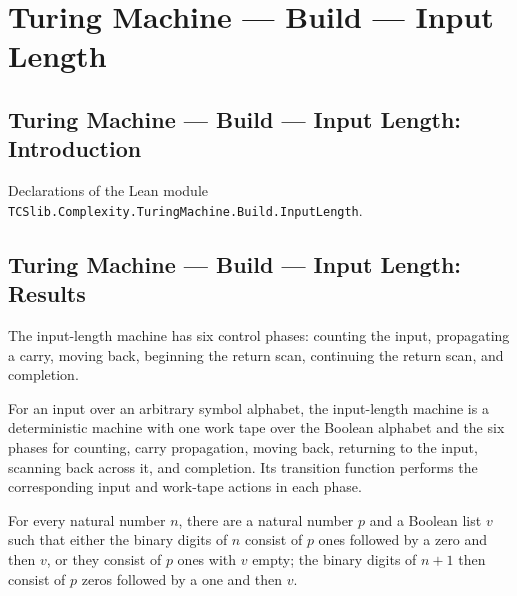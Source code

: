 \section{Turing Machine --- Build --- Input Length}
\subsection*{Turing Machine --- Build --- Input Length: Introduction}

Declarations of the Lean module \texttt{TCSlib.Complexity.TuringMachine.Build.InputLength}.

\subsection*{Turing Machine --- Build --- Input Length: Results}

\begin{definition}
\label{Turing.InputLengthPhase}
\leanok
The input-length machine has six control phases: counting the input, propagating a
carry, moving back, beginning the return scan, continuing the return scan, and
completion.
\end{definition}

\begin{definition}
\label{Turing.inputLengthMachine}
\leanok
{}
For an input over an arbitrary symbol alphabet, the input-length machine is a
deterministic machine with one work tape over the Boolean alphabet and the six phases
for counting, carry propagation, moving back, returning to the input, scanning back
across it, and completion. Its transition function performs the corresponding input and
work-tape actions in each phase.
\end{definition}

\begin{theorem}
\label{Turing.inputLength_digits}
\leanok
{}
For every natural number $n$, there are a natural number $p$ and a Boolean list $v$ such
that either the binary digits of $n$ consist of $p$ ones followed by a zero and then
$v$, or they consist of $p$ ones with $v$ empty; the binary digits of $n+1$ then consist
of $p$ zeros followed by a one and then $v$.
\end{theorem}

